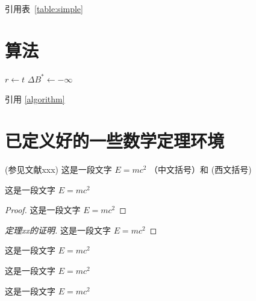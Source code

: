 引用表~\ref{table:simple}


\section{算法}

\begin{algorithm}
\caption{Simulation-optimization heuristic}\label{algorithm}
$r\leftarrow t$\;
$\Delta B^{\ast}\leftarrow -\infty$\;
\end{algorithm}

引用 \autoref{algorithm}

\section{已定义好的一些数学定理环境}


\begin{definition}[测度]
  (参见文献xxx) 这是一段文字 $E = m c^2$  （中文括号）和 (西文括号)
\end{definition}

\begin{theorem}
  这是一段文字 $E = m c^2$
\end{theorem}


\begin{proof}
  这是一段文字 $E = m c^2$
\end{proof}

\begin{proof}[定理xx的证明]
  这是一段文字 $E = m c^2$
\end{proof}

\begin{example}
  这是一段文字 $E = m c^2$
\end{example}

\begin{property}
  这是一段文字 $E = m c^2$
\end{property}

\begin{proposition}
  这是一段文字 $E = m c^2$
\end{proposition}

